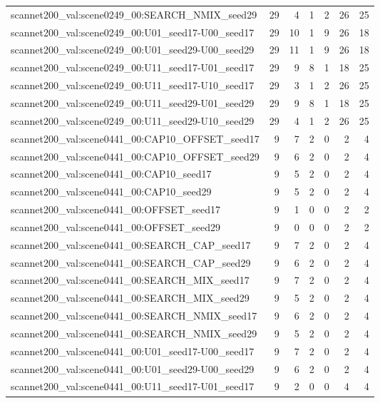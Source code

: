 \begin{table}[t]
\begin{tabular}{lrrrrrr}
scannet200\_val:scene0249\_00:SEARCH\_NMIX\_seed29 & 29 & 4 & 1 & 2 & 26 & 25 \\
scannet200\_val:scene0249\_00:U01\_seed17-U00\_seed17 & 29 & 10 & 1 & 9 & 26 & 18 \\
scannet200\_val:scene0249\_00:U01\_seed29-U00\_seed29 & 29 & 11 & 1 & 9 & 26 & 18 \\
scannet200\_val:scene0249\_00:U11\_seed17-U01\_seed17 & 29 & 9 & 8 & 1 & 18 & 25 \\
scannet200\_val:scene0249\_00:U11\_seed17-U10\_seed17 & 29 & 3 & 1 & 2 & 26 & 25 \\
scannet200\_val:scene0249\_00:U11\_seed29-U01\_seed29 & 29 & 9 & 8 & 1 & 18 & 25 \\
scannet200\_val:scene0249\_00:U11\_seed29-U10\_seed29 & 29 & 4 & 1 & 2 & 26 & 25 \\
scannet200\_val:scene0441\_00:CAP10\_OFFSET\_seed17 & 9 & 7 & 2 & 0 & 2 & 4 \\
scannet200\_val:scene0441\_00:CAP10\_OFFSET\_seed29 & 9 & 6 & 2 & 0 & 2 & 4 \\
scannet200\_val:scene0441\_00:CAP10\_seed17 & 9 & 5 & 2 & 0 & 2 & 4 \\
scannet200\_val:scene0441\_00:CAP10\_seed29 & 9 & 5 & 2 & 0 & 2 & 4 \\
scannet200\_val:scene0441\_00:OFFSET\_seed17 & 9 & 1 & 0 & 0 & 2 & 2 \\
scannet200\_val:scene0441\_00:OFFSET\_seed29 & 9 & 0 & 0 & 0 & 2 & 2 \\
scannet200\_val:scene0441\_00:SEARCH\_CAP\_seed17 & 9 & 7 & 2 & 0 & 2 & 4 \\
scannet200\_val:scene0441\_00:SEARCH\_CAP\_seed29 & 9 & 6 & 2 & 0 & 2 & 4 \\
scannet200\_val:scene0441\_00:SEARCH\_MIX\_seed17 & 9 & 7 & 2 & 0 & 2 & 4 \\
scannet200\_val:scene0441\_00:SEARCH\_MIX\_seed29 & 9 & 5 & 2 & 0 & 2 & 4 \\
scannet200\_val:scene0441\_00:SEARCH\_NMIX\_seed17 & 9 & 6 & 2 & 0 & 2 & 4 \\
scannet200\_val:scene0441\_00:SEARCH\_NMIX\_seed29 & 9 & 5 & 2 & 0 & 2 & 4 \\
scannet200\_val:scene0441\_00:U01\_seed17-U00\_seed17 & 9 & 7 & 2 & 0 & 2 & 4 \\
scannet200\_val:scene0441\_00:U01\_seed29-U00\_seed29 & 9 & 6 & 2 & 0 & 2 & 4 \\
scannet200\_val:scene0441\_00:U11\_seed17-U01\_seed17 & 9 & 2 & 0 & 0 & 4 & 4 \\

\end{tabular}
\end{table}
